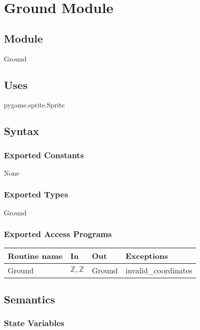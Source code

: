 \documentclass[12pt]{article}
\begin{document}
\newpage

\section* {Ground Module}

\subsection*{Module}

Ground

\subsection* {Uses}

pygame.sprite.Sprite

\subsection* {Syntax}

\subsubsection* {Exported Constants}

None

\subsubsection* {Exported Types}

Ground

\subsubsection* {Exported Access Programs}

\begin{tabular}{| l | l | l | l |}
\hline
\textbf{Routine name} & \textbf{In} & \textbf{Out} & \textbf{Exceptions}\\
\hline
Ground &$\mathbb{Z}, \mathbb{Z}$ & Ground & invalid\_coordinates\\
\hline

\end{tabular}

\subsection* {Semantics}

\subsubsection* {State Variables}
\end{document}
